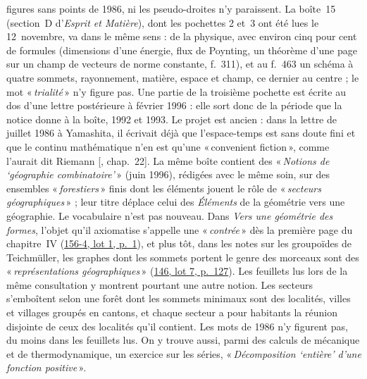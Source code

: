 \documentclass[11pt]{amsart}
\makeatletter
\newcommand{\q}[1]{«\,\textit{#1}\,»}
\newcommand{\mot}[1]{«\,#1\,»}
\def\RHM@first#1--#2\@nil{#1}
\DeclareRobustCommand{\lot}[3]{\begingroup\edef\RHM@pdfpage{\the\numexpr\RHM@first#3--\@nil+1\relax}\href{https://grothendieck.umontpellier.fr/#1.pdf\#page=\RHM@pdfpage}{#1, lot #2, p.~#3}\endgroup}
\newcommand{\lot}[3]{\href{https://grothendieck.commutator.io/\##1/#2/p#3}{#1, lot #2, p.~#3}}
\makeatother
\begin{document}
figures sans points de 1986, ni les pseudo-droites n'y paraissent. La boîte~15 (section~D d'\emph{Esprit et Matière}), dont les pochettes 2 et~3 ont été lues le 12~novembre, va dans le même sens : de la physique, avec environ cinq pour cent de formules (dimensions d'une énergie, flux de Poynting, un théorème d'une page sur un champ de vecteurs de norme constante, f.~311), et au f.~463 un schéma à quatre sommets, rayonnement, matière, espace et champ, ce dernier au centre ; le mot \q{trialité} n'y figure pas. Une partie de la troisième pochette est écrite au dos d'une lettre postérieure à février 1996 : elle sort donc de la période que la notice donne à la boîte, 1992 et 1993. Le projet est ancien : dans la lettre de juillet 1986 à Yamashita, il écrivait déjà que l'espace-temps est sans doute fini et que le continu mathématique n'en est qu'une \mot{\foreignlanguage{english}{convenient fiction}}, comme l'aurait dit Riemann [\citealp{circle-spirit}, chap.~22]. La même boîte contient des \q{Notions de ‘géographie combinatoire’} (juin 1996), rédigées avec le même soin, sur des ensembles \q{forestiers} finis dont les éléments jouent le rôle de \q{secteurs géographiques} ; leur titre déplace celui des \emph{Éléments} de la géométrie vers une géographie. Le vocabulaire n'est pas nouveau. Dans \emph{Vers une géométrie des formes}, l'objet qu'il axiomatise s'appelle une \q{contrée} dès la première page du chapitre~IV (\lot{156-4}{1}{1}), et plus tôt, dans les notes sur les groupoïdes de Teichmüller, les graphes dont les sommets portent le genre des morceaux sont des \q{représentations géographiques} (\lot{146}{7}{127}). Les feuillets lus lors de la même consultation y montrent pourtant une autre notion. Les secteurs s'emboîtent selon une forêt dont les sommets minimaux sont des localités, villes et villages groupés en cantons, et chaque secteur a pour habitants la réunion disjointe de ceux des localités qu'il contient. Les mots de 1986 n'y figurent pas, du moins dans les feuillets lus. On y trouve aussi, parmi des calculs de mécanique et de thermodynamique, un exercice sur les séries, \q{Décomposition ‘entière’ d'une fonction positive}.
\end{document}
